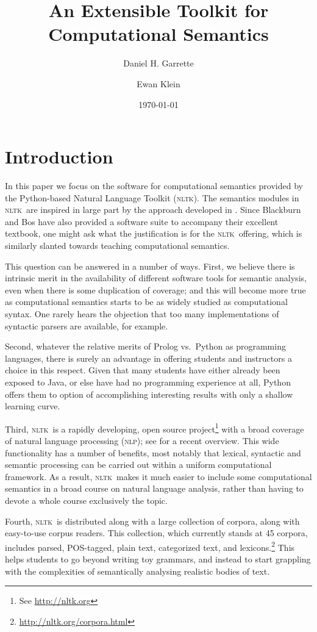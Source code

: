 \documentclass[11pt,a4paper]{article}
\newcommand{\NLP}{\textsc{nlp}}
\newcommand{\NLTK}{\textsc{nltk}}
\begin{document}
\title{An Extensible Toolkit for Computational Semantics}
\author{Daniel H. Garrette \and Ewan Klein}
\date{\today}
\maketitle

\section{Introduction}

In this paper we focus on the software for computational semantics provided
by the Python-based Natural Language Toolkit (\NLTK). The semantics
modules in \NLTK\ are
inspired in large part by the approach developed in \citet{BB}.
Since Blackburn and Bos have also provided a software suite to
accompany their excellent textbook, one might ask what the
justification is for the \NLTK\ offering, which is similarly slanted
towards teaching computational semantics.

This question can be answered in a number of ways. First, we believe
there is intrinsic merit in the availability of different software
tools for semantic analysis, even when there is some duplication of
coverage; and this will become more true as computational semantics
starts to be as widely studied as computational syntax. One rarely
hears the objection that too many implementations of syntactic
parsers are available, for example.

Second, whatever the relative merits of Prolog vs.\ Python as
programming languages, there is surely an advantage in offering
students and instructors a choice in this respect. Given that many
students have either already been exposed to Java, or else have had no
programming experience at all, Python offers them to option of
accomplishing interesting results with only a shallow
learning curve.

Third, \NLTK\ is a rapidly developing, open source
project\footnote{See \url{http://nltk.org}} with a broad coverage of
natural language processing (\NLP); see \citet{Multidisciplinary} for
a recent overview. This wide functionality has a number of benefits,
most notably that lexical, syntactic and semantic processing can be
carried out within a uniform computational framework. As a result,
\NLTK\ makes it much easier to include some computational semantics in
a broad course on natural language analysis, rather than having to
devote a whole course exclusively the topic.

Fourth, \NLTK\ is distributed along with a large collection of
corpora, along with easy-to-use corpus readers.  This collection,
which currently stands at 45 corpora, includes parsed, POS-tagged,
plain text, categorized text, and
lexicons.\footnote{\url{http://nltk.org/corpora.html}} This helps
students to go beyond writing toy grammars, and instead to start 
grappling with the complexities of semantically analysing realistic
bodies of text.
\end{document}
